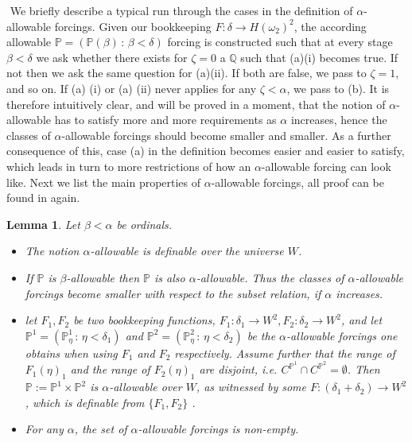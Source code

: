 \documentclass[a4paper,11pt]{article}
\newtheorem{lemma}[theorem]{Lemma}
\newcommand{\forceP}{\mathbb{P}}
\newcommand{\forceQ}{\mathbb{Q}}
\begin{document}
    ﻿
    We briefly describe a typical run through the cases in the definition of $\alpha$-allowable forcings. Given our bookkeeping $F: \delta \rightarrow H(\omega_2)^2$, the according allowable $\forceP= (\forceP(\beta) \, : \, \beta < \delta)$ forcing is constructed such that at every stage $\beta< \delta$  we ask whether there exists for $\zeta=0$ a $\forceQ$ such that (a)(i) becomes true. If not then we ask the same question for (a)(ii). If both are false, we pass to $\zeta=1$, and so on. If (a) (i) or (a) (ii) never applies for any $\zeta < \alpha$, we pass to (b). It is therefore intuitively clear, and will be proved in a moment, that the notion of $\alpha$-allowable has to satisfy more and more requirements as $\alpha$ increases, hence the classes of $\alpha$-allowable forcings should become smaller and smaller. As a further consequence of this, case (a) in the definition becomes easier and easier to satisfy, which leads in turn to more restrictions of how an $\alpha$-allowable forcing can look like. Next we list the main properties of $\alpha$-allowable forcings, all proof can be found in \cite{Reduction} again.
    ﻿
    ﻿
    ﻿
    \begin{lemma}
Let $\beta < \alpha$ be ordinals. 
\begin{itemize}
\item The notion $\alpha$-allowable is definable over the universe $W$. 
\item    If $\forceP$ is $\beta$-allowable then $\forceP$ is also $\alpha$-allowable. Thus the classes of $\alpha$-allowable forcings become smaller with respect to the subset relation, if $\alpha$ increases.
\item let $F_1, F_2$ be two bookkeeping functions, $F_1: \delta_1 \rightarrow W^2, F_2: \delta_2 \rightarrow W^2$, and let $\forceP^1=(\forceP^1_{\eta} \, : \, \eta < \delta_1)$ and $\forceP^2=(\forceP^2_{\eta} \, : \, \eta < \delta_2)$ be the $\alpha$-allowable forcings one obtains when using $F_1$ and $F_2$ respectively. Assume further that the range of $F_1 (\eta)_1$ and the range of $F_2(\eta)_1$ are disjoint, i.e. $C^{\forceP^1} \cap C^{\forceP^2} = \emptyset$.
    ﻿
    ﻿
    Then $\forceP:=\forceP^1 \times \forceP^2$ is $\alpha$-allowable over $W$, as witnessed by some $F: (\delta_1+\delta_2) \rightarrow W^2$, which is definable from $\{F_1,F_2\}$ .
\item  For any $\alpha$, the set of $\alpha$-allowable forcings is non-empty.
    ﻿
    ﻿
\end{itemize}
    ﻿
    
    ﻿
    \end{lemma}
    
\end{document}
